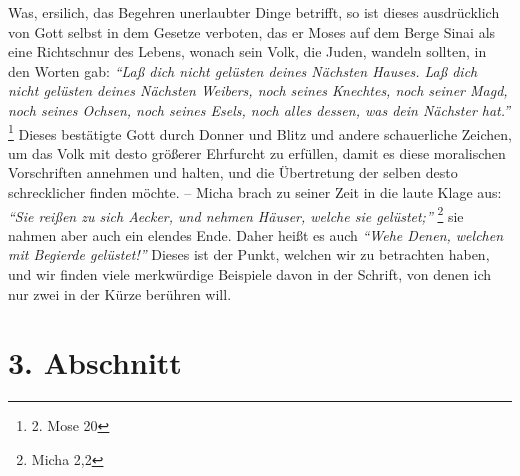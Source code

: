 Was, ersilich, das Begehren unerlaubter Dinge betrifft, so ist dieses
ausdrücklich von Gott selbst in dem Gesetze verboten, das er Moses auf dem
Berge Sinai als eine Richtschnur des Lebens, wonach sein Volk, die Juden,
wandeln sollten, in den Worten gab:
\textit{"`Laß dich nicht gelüsten deines Nächsten
Hauses. Laß dich nicht gelüsten deines Nächsten Weibers, noch seines Knechtes,
noch seiner Magd, noch seines Ochsen, noch seines Esels, noch alles dessen, was
dein Nächster hat."'}
\footnote{2. Mose 20}
Dieses bestätigte Gott durch Donner und
Blitz und andere schauerliche Zeichen, um das Volk mit desto größerer Ehrfurcht
zu erfüllen, damit es diese moralischen Vorschriften annehmen und halten, und
die Übertretung der selben desto schrecklicher finden möchte. -- Micha brach zu
seiner Zeit in die laute Klage aus:
\textit{"`Sie reißen zu sich Aecker, und nehmen
Häuser, welche sie gelüstet;"'}
\footnote{Micha 2,2}
sie nahmen aber auch ein
elendes Ende. Daher heißt es auch
\textit{"`Wehe Denen, welchen mit Begierde gelüstet!"'}
Dieses ist der Punkt, welchen wir zu betrachten haben, und wir finden viele
merkwürdige Beispiele davon in der Schrift, von denen ich nur zwei in der Kürze
berühren will.

\section{3. Abschnitt} \label{kap13_ab3}

